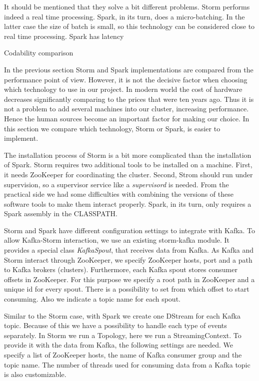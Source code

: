 

It should be mentioned that they solve a bit different problems.
Storm performs indeed a real time processing.
Spark, in its turn, does a micro-batching.
In the latter case the size of batch is small, so this technology can be considered close to real time processing.
Spark has latency

Codability comparison

In the previous section Storm and Spark implementations are compared from the performance point of view.
However, it is not the decisive factor when choosing which technology to use in our project.
In modern world the cost of hardware decreases significantly comparing to the prices that were ten years ago.
Thus it is not a problem to add several machines into our cluster, increasing performance.
Hence the human sources become an important factor for making our choice.
In this section we compare which technology, Storm or Spark, is easier to implement.

The installation process of Storm is a bit more complicated than the installation of Spark.
Storm requires two additional tools to be installed on a machine.
First, it needs ZooKeeper for coordinating the cluster.
Second, Strom should run under supervision, so a supervisor service like a \textit{supervisord} is needed.
From the practical side we had some difficulties with combining the versions of these software tools to make them interact properly.
Spark, in its turn, only requires a Spark assembly in the CLASSPATH.

Storm and Spark have different configuration settings to integrate with Kafka.
To allow Kafka-Storm interaction, we use an existing storm-kafka module.
It provides a special class \textit{KafkaSpout}, that receives data from Kafka.
As Kafka and Storm interact through ZooKeeper, we specify ZooKeeper hosts, port and a path to Kafka brokers (clusters).
Furthermore, each Kafka spout stores consumer offsets in ZooKeeper.
For this purpose we specify a root path in ZooKeeper and a unique id for every spout.
There is a possibility to set from which offset to start consuming.
Also we indicate a topic name for each spout.

Similar to the Storm case, with Spark we create one DStream for each Kafka topic.
Because of this we have a possibility to handle each type of events separately.
In Storm we run a Topology, here we run a StreamingContext.
To provide it with the data from Kafka, the following settings are needed.
We specify a list of ZooKeeper hosts, the name of Kafka consumer group and the topic name.
The number of threads used for consuming data from a Kafka topic is also customizable.

